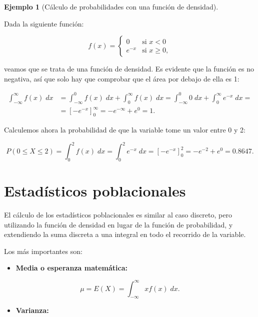 \documentclass[
  spanish,
  a4paper,
]{scrreport}
\providecommand{\tightlist}{%
  \setlength{\itemsep}{0pt}\setlength{\parskip}{0pt}}
\theoremstyle{plain}
\theoremstyle{definition}
\newtheorem{example}{Ejemplo}[chapter]
\theoremstyle{definition}
\theoremstyle{remark}
\begin{document}
\begin{example}[Cálculo de probabilidades con una función de
densidad]\protect\hypertarget{exm-calculo-probabilidades-integral}{}\label{exm-calculo-probabilidades-integral}

Dada la siguiente función:

\[
f(x) =
\begin{cases}
0 & \mbox{si } x<0\\
e^{-x} & \mbox{si } x\geq 0,
\end{cases}
\]

veamos que se trata de una función de densidad. Es evidente que la
función es no negativa, así que solo hay que comprobar que el área por
debajo de ella es 1:

\[
\begin{aligned}
\int_{-\infty}^\infty f(x)\;dx &= \int_{-\infty}^0 f(x)\;dx +\int_0^\infty f(x)\;dx = \int_{-\infty}^0 0\;dx +\int_0^\infty e^{-x}\;dx =\\
&= \left[-e^{-x}\right]_0^{\infty} = -e^{-\infty}+e^0 = 1.
\end{aligned}
\]

Calculemos ahora la probabilidad de que la variable tome un valor entre
0 y 2:

\[
P(0\leq X\leq 2) = \int_0^2 f(x)\;dx = \int_0^2 e^{-x}\;dx = \left[-e^{-x}\right]_0^2 = -e^{-2}+e^0 = 0.8647.
\]

\end{example}

\section{Estadísticos
poblacionales}\label{estaduxedsticos-poblacionales-1}

El cálculo de los estadísticos poblacionales es similar al caso
discreto, pero utilizando la función de densidad en lugar de la función
de probabilidad, y extendiendo la suma discreta a una integral en todo
el recorrido de la variable.

Los más importantes son:

\begin{itemize}
\tightlist
\item
  \textbf{Media o esperanza matemática:}
\end{itemize}

\[
\mu = E(X) = \int_{-\infty}^\infty x f(x)\; dx.
\]

\begin{itemize}
\tightlist
\item
  \textbf{Varianza:}
\end{itemize}
\end{document}
